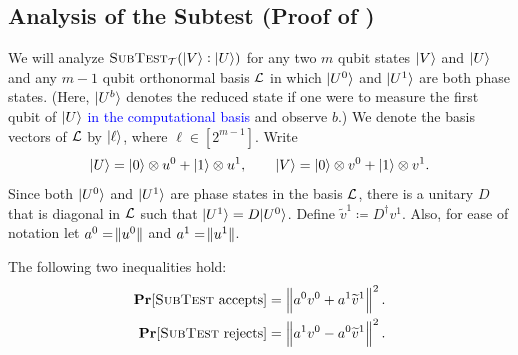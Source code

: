 \subsection{Analysis of the Subtest (Proof of )} \label{sec:subtest}


We will analyze $\textsc{SubTest}_{\calT}(\ket{V}: \ket{U})$ for any two $m$ qubit states $\ket{V}$ and $\ket{U}$ and any $m-1$ qubit orthonormal basis $\calL$ in which $\ket{U^0}$ and $\ket{U^1}$ are both phase states. 
(Here, $\ket{U^b}$ denotes the reduced state if one were to measure the first qubit of $\ket{U}$ \textcolor{blue}{in the computational basis} and observe $b$.) We denote the basis vectors of $\calL$ by $\ket{\ell}$, where $\ell \in [2^{m-1}]$.
Write
\begin{equation*}
    \ket{U} = \ket{0}\otimes u^0 + \ket{1}\otimes u^1, \qquad 
    \ket{V} = \ket{0}\otimes v^0 + \ket{1}\otimes v^1.
\end{equation*}
Since both $\ket{U^0}$ and $\ket{U^1}$ are phase states in the basis $\calL$, there is a unitary $D$ that is diagonal in $\calL$ such that $\ket{U^1} = D\ket{U^0}$. Define $\widetilde{v}^1 \coloneqq D^\dagger v^1$. Also, for ease of notation let $a^0=\norm{\smash{u^0}}$ and $a^1 = \norm{\smash{u^1}}$.
\begin{proposition} \label{prop:subtest}
    The following two inequalities hold:
    \begin{align} 
        \Pr[\textsc{SubTest} \text{ accepts}] &= \left\|a^0 v^0 + a^1 \widetilde{v}^1\right\|^2. \label{eqn:acc0} \\
        \Pr[\textsc{SubTest} \text{ rejects}] &= \left\|a^1 v^0 - a^0 \widetilde{v}^1\right\|^2. \label{eqn:start}
    \end{align}
\end{proposition}


